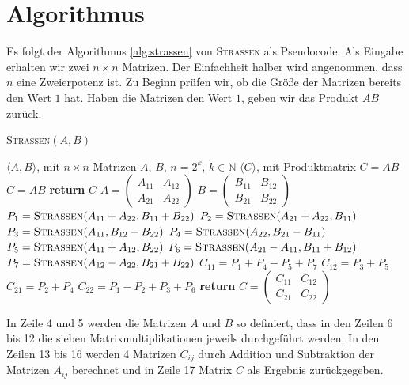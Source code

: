 \documentclass{scrartcl}
\begin{document}
\section{Algorithmus}
Es folgt der Algorithmus \ref{alg:strassen} von \textsc{Strassen}  als Pseudocode. Als Eingabe erhalten wir zwei $n \times n$ Matrizen. Der Einfachheit halber wird angenommen, dass $n$ eine Zweierpotenz ist. Zu Beginn prüfen wir, ob die Größe der Matrizen bereits den Wert $1$ hat. Haben die Matrizen den Wert $1$, geben wir das Produkt $A B$ zurück.
\begin{algorithm}
	\caption{\textsc{Strassen}$(A, B)$}
	\label{alg:strassen}
	\begin{algorithmic}[1]
		\Require $\langle A, B \rangle$, mit $n \times n$ Matrizen $A$, $B$, $n = 2^k$, $k \in \mathbb{N}$
		\Ensure $\langle C \rangle$, mit Produktmatrix $C = AB$
		 $C = AB$ %
		\State \textbf{return} $C$
		\EndIf
		\State $A = \begin{pmatrix} A_{11} & A_{12} \\ A_{21} & A_{22} \end{pmatrix}$
		\State $B = \begin{pmatrix} B_{11} & B_{12} \\ B_{21} & B_{22} \end{pmatrix}$
		\State $P_1 = \textsc{Strassen}(A_{11} + A_{22}, B_{11} + B_{22})$
		\State $P_2 = \textsc{Strassen}(A_{21} + A_{22}, B_{11})$
		\State $P_3 = \textsc{Strassen}(A_{11}, B_{12} - B_{22})$
		\State $P_4 = \textsc{Strassen}(A_{22}, B_{21} - B_{11})$
		\State $P_5 = \textsc{Strassen}(A_{11} + A_{12}, B_{22})$
		\State $P_6 = \textsc{Strassen}(A_{21} - A_{11}, B_{11} + B_{12})$
		\State $P_7 = \textsc{Strassen}(A_{12} - A_{22}, B_{21} + B_{22})$
		\State $C_{11} = P_1 + P_4 - P_5 + P_7$
		\State $C_{12} = P_3 + P_5$
		\State $C_{21} = P_2 + P_4$
		\State $C_{22} = P_1 - P_2 + P_3 + P_6$
		\State \textbf{return} $C = \begin{pmatrix} C_{11} & C_{12} \\ C_{21} & C_{22} \end{pmatrix}$
	\end{algorithmic}
\end{algorithm}
In Zeile 4 und 5 werden die Matrizen $A$ und $B$ so definiert, dass in den Zeilen 6 bis 12 die sieben Matrixmultiplikationen jeweils durchgeführt werden. In den Zeilen 13 bis 16 werden 4 Matrizen $C_{ij}$ durch Addition und Subtraktion der Matrizen $A_{ij}$ berechnet und in Zeile 17 Matrix $C$ als Ergebnis zurückgegeben.
\end{document}
